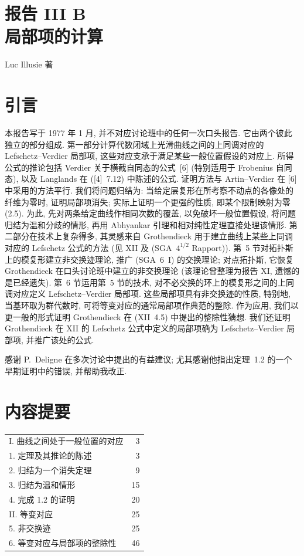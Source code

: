 \clearpage
{}
\section*{报告 III B\\局部项的计算}
\begin{center}
Luc Illusie 著
\end{center}

\section*{引言}

本报告写于 1977 年 1 月, 并不对应讨论班中的任何一次口头报告. 它由两个彼此独立的部分组成. 第一部分计算代数闭域上光滑曲线之间的上同调对应的 Lefschetz--Verdier 局部项, 这些对应支承于满足某些一般位置假设的对应上. 所得公式的推论包括 Verdier 关于横截自同态的公式~[6] (特别适用于 Frobenius 自同态), 以及 Langlands 在 ([4]~7.12) 中陈述的公式. 证明方法与 Artin--Verdier 在 [6] 中采用的方法平行. 我们将问题归结为: 当给定层复形在所考察不动点的各像处的纤维为零时, 证明局部项消失; 实际上证明一个更强的性质, 即某个限制映射为零 (2.5). 为此, 先对两条给定曲线作相同次数的覆盖, 以免破坏一般位置假设, 将问题归结为温和分歧的情形, 再用 Abhyankar 引理和相对纯性定理直接处理该情形. 第二部分在技术上复杂得多, 其灵感来自 Grothendieck 用于建立曲线上某些上同调对应的 Lefschetz 公式的方法 (见 XII 及 (SGA~$4^{1/2}$ Rapport)). 第~5 节对拓扑斯上的模复形建立非交换迹理论, 推广 (SGA~6~I) 的交换理论; 对点拓扑斯, 它恢复 Grothendieck 在口头讨论班中建立的非交换理论 (该理论曾整理为报告 XI, 遗憾的是已经遗失). 第~6 节运用第~5 节的技术, 对不必交换的环上的模复形之间的上同调对应定义 Lefschetz--Verdier 局部项. 这些局部项具有非交换迹的性质, 特别地, 当基环取为群代数时, 可将等变对应的通常局部项作典范的整除. 作为应用, 我们以更一般的形式证明 Grothendieck 在 (XII~4.5) 中提出的整除性猜想. 我们还证明 Grothendieck 在 XII 的 Lefschetz 公式中定义的局部项确为 Lefschetz--Verdier 局部项, 并推广该处的公式.

感谢 P.~Deligne 在多次讨论中提出的有益建议; 尤其感谢他指出定理~1.2 的一个早期证明中的错误, 并帮助我改正.

\section*{内容提要}
\begin{tabular}{@{}p{}r@{}}
I. 曲线之间处于一般位置的对应 & 3\\
1. 定理及其推论的陈述 & 3\\
2. 归结为一个消失定理 & 9\\
3. 归结为温和情形 & 15\\
4. 完成 1.2 的证明 & 20\\
II. 等变对应 & 25\\
5. 非交换迹 & 25\\
6. 等变对应与局部项的整除性 & 46
\end{tabular}

